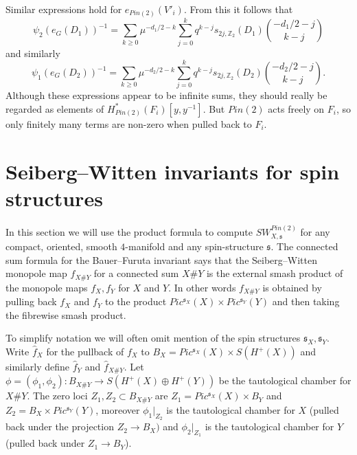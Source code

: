 \documentclass{amsart}
\theoremstyle{definition}
\theoremstyle{remark}
\numberwithin{equation}{section}
\begin{document}
Similar expressions hold for $e_{Pin(2)}(V'_i)$. From this it follows that 
\[
\psi_2( e_{G}(D_1) )^{-1} = \sum_{k \ge 0} \mu^{-d_1/2 - k} \sum_{j=0}^k q^{k-j}  s_{2j , \mathbb{Z}_2}(D_1) \binom{ -d_1/2 - j}{k-j}
\]
and similarly
\[
\psi_1( e_{G}(D_2) )^{-1} = \sum_{k \ge 0} \mu^{-d_2/2 - k}  \sum_{j=0}^k q^{k-j}  s_{2j , \mathbb{Z}_2}(D_2) \binom{ -d_2/2 - j}{k-j}.
\]
Although these expressions appear to be infinite sums, they should really be regarded as elements of $H^*_{Pin(2)}(F_i)[y,y^{-1}]$. But $Pin(2)$ acts freely on $F_i$, so only finitely many terms are non-zero when pulled back to $F_i$.

\section{Seiberg--Witten invariants for spin structures}\label{sec:swspin}

In this section we will use the product formula to compute $SW^{Pin(2)}_{X,\mathfrak{s}}$ for any compact, oriented, smooth $4$-manifold and any spin-structure $\mathfrak{s}$. The connected sum formula for the Bauer--Furuta invariant \cite{b2} says that the Seiberg--Witten monopole map $f_{X \# Y}$ for a connected sum $X \# Y$ is the external smash product of the monopole maps $f_X, f_Y$ for $X$ and $Y$. In other words $f_{X\#Y}$ is obtained by pulling back $f_X$ and $f_Y$ to the product $Pic^{\mathfrak{s}_X}(X) \times Pic^{\mathfrak{s}_Y}(Y)$ and then taking the fibrewise smash product.

To simplify notation we will often omit mention of the spin structures $\mathfrak{s}_X, \mathfrak{s}_Y$. Write $\widehat{f}_X$ for the pullback of $f_X$ to $B_{X} = Pic^{\mathfrak{s}_X}(X) \times S(H^+(X))$ and similarly define $\widehat{f}_Y$ and $\widehat{f}_{X \# Y}$. Let $\phi = (\phi_1 , \phi_2) : B_{X \# Y } \to S( H^+(X) \oplus H^+(Y) )$ be the tautological chamber for $X \# Y$. The zero loci $Z_1, Z_2 \subset B_{X \# Y}$ are $Z_1 = Pic^{\mathfrak{s}_X}(X) \times B_Y$ and $Z_2 = B_X \times Pic^{\mathfrak{s}_Y}(Y)$, moreover $\phi_1|_{Z_2}$ is the tautological chamber for $X$ (pulled back under the projection $Z_2 \to B_X)$ and $\phi_2|_{Z_1}$ is the tautological chamber for $Y$ (pulled back under $Z_1 \to B_Y$).
\end{document}
